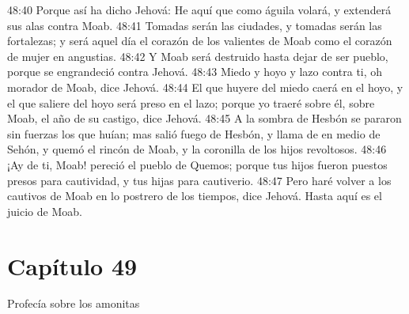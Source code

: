 48:40 Porque así ha dicho Jehová: He aquí que como águila volará, y extenderá sus alas contra Moab. 
48:41 Tomadas serán las ciudades, y tomadas serán las fortalezas; y será aquel día el corazón de los valientes de Moab como el corazón de mujer en angustias. 
48:42 Y Moab será destruido hasta dejar de ser pueblo, porque se engrandeció contra Jehová. 
48:43 Miedo y hoyo y lazo contra ti, oh morador de Moab, dice Jehová. 
48:44 El que huyere del miedo caerá en el hoyo, y el que saliere del hoyo será preso en el lazo; porque yo traeré sobre él, sobre Moab, el año de su castigo, dice Jehová. 
48:45 A la sombra de Hesbón se pararon sin fuerzas los que huían; mas salió fuego de Hesbón, y llama de en medio de Sehón, y quemó el rincón de Moab, y la coronilla de los hijos revoltosos. 
48:46 ¡Ay de ti, Moab! pereció el pueblo de Quemos; porque tus hijos fueron puestos presos para cautividad, y tus hijas para cautiverio. 
48:47 Pero haré volver a los cautivos de Moab en lo postrero de los tiempos, dice Jehová. Hasta aquí es el juicio de Moab.  
\section*{Capítulo 49 }
Profecía sobre los amonitas 
 
